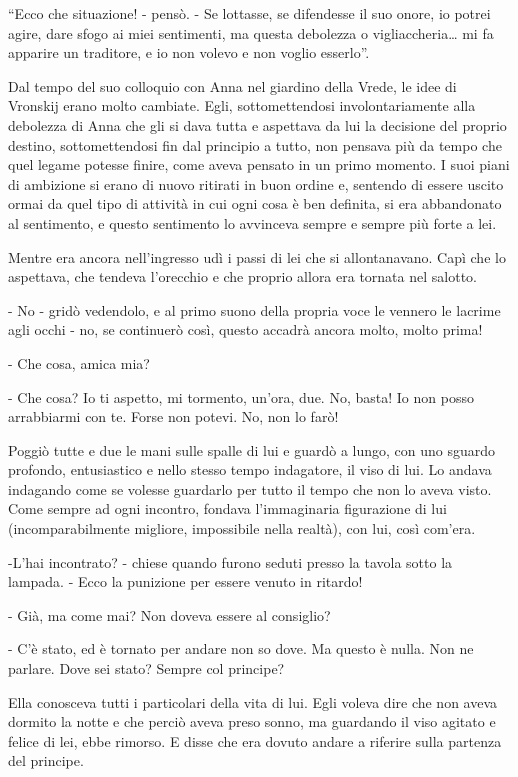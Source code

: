 ``Ecco che situazione! - pensò. - Se lottasse, se difendesse il suo onore, io potrei agire, dare sfogo ai miei sentimenti, ma questa debolezza o vigliaccheria\ldots{} mi fa apparire un traditore, e io non volevo e non voglio esserlo''. 

Dal tempo del suo colloquio con Anna nel giardino della Vrede, le idee di Vronskij erano molto cambiate. Egli, sottomettendosi involontariamente alla debolezza di Anna che gli si dava tutta e aspettava da lui la decisione del proprio destino, sottomettendosi fin dal principio a tutto, non pensava più da tempo che quel legame potesse finire, come aveva pensato in un primo momento. I suoi piani di ambizione si erano di nuovo ritirati in buon ordine e, sentendo di essere uscito ormai da quel tipo di attività in cui ogni cosa è ben definita, si era abbandonato al sentimento, e questo sentimento lo avvinceva sempre e sempre più forte a lei. 

Mentre era ancora nell'ingresso udì i passi di lei che si allontanavano. Capì che lo aspettava, che tendeva l'orecchio e che proprio allora era tornata nel salotto. 

- No - gridò vedendolo, e al primo suono della propria voce le vennero le lacrime agli occhi - no, se continuerò così, questo accadrà ancora molto, molto prima! 

- Che cosa, amica mia? 

- Che cosa? Io ti aspetto, mi tormento, un'ora, due. No, basta! Io non posso arrabbiarmi con te. Forse non potevi. No, non lo farò! 

Poggiò tutte e due le mani sulle spalle di lui e guardò a lungo, con uno sguardo profondo, entusiastico e nello stesso tempo indagatore, il viso di lui. Lo andava indagando come se volesse guardarlo per tutto il tempo che non lo aveva visto. Come sempre ad ogni incontro, fondava l'immaginaria figurazione di lui (incomparabilmente migliore, impossibile nella realtà), con lui, così com'era. 

-L'hai incontrato? - chiese quando furono seduti presso la tavola sotto la lampada. - Ecco la punizione per essere venuto in ritardo! 

- Già, ma come mai? Non doveva essere al consiglio? 

- C'è stato, ed è tornato per andare non so dove. Ma questo è nulla. Non ne parlare. Dove sei stato? Sempre col principe? 

Ella conosceva tutti i particolari della vita di lui. Egli voleva dire che non aveva dormito la notte e che perciò aveva preso sonno, ma guardando il viso agitato e felice di lei, ebbe rimorso. E disse che era dovuto andare a riferire sulla partenza del principe. 

